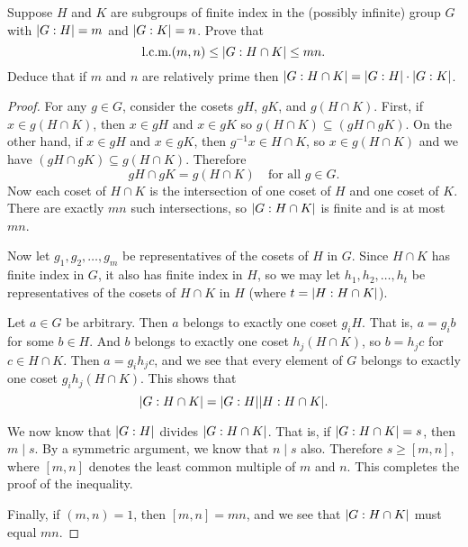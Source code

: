  Suppose $H$ and $K$ are subgroups of finite index in the
(possibly infinite) group $G$ with $\lvert{G:H}\rvert = m$ and
$\lvert{G:K}\rvert = n$. Prove that
\begin{equation*}
  \text{l.c.m.}(m,n)\leq\lvert{G:H\cap K}\rvert\leq mn.
\end{equation*}
Deduce that if $m$ and $n$ are relatively prime then
$\lvert{G:H\cap K}\rvert = \lvert{G:H}\rvert\cdot\lvert{G:K}\rvert$.
\begin{proof}
  For any $g\in G$, consider the cosets $gH$, $gK$, and $g(H\cap
  K)$. First, if $x\in g(H\cap K)$, then $x\in gH$ and $x\in gK$ so
  $g(H\cap K)\subseteq(gH\cap gK)$. On the other hand, if $x\in gH$
  and $x\in gK$, then $g^{-1}x\in H\cap K$, so $x\in g(H\cap K)$ and
  we have $(gH\cap gK)\subseteq g(H\cap K)$. Therefore
  \begin{equation*}
    gH\cap gK = g(H\cap K)
    \quad\text{for all $g\in G$}.
  \end{equation*}
  Now each coset of $H\cap K$ is the intersection of one coset of $H$
  and one coset of $K$. There are exactly $mn$ such intersections, so
  $\lvert{G:H\cap K}\rvert$ is finite and is at most $mn$.

  Now let $g_1,g_2,\dots,g_m$ be representatives of the cosets of $H$
  in $G$. Since $H\cap K$ has finite index in $G$, it also has finite
  index in $H$, so we may let $h_1,h_2,\dots,h_t$ be representatives
  of the cosets of $H\cap K$ in $H$ (where $t = \lvert{H:H\cap
    K}\rvert$).

  Let $a\in G$ be arbitrary. Then $a$ belongs to exactly one coset
  $g_iH$. That is, $a = g_ib$ for some $b\in H$. And $b$ belongs to
  exactly one coset $h_j(H\cap K)$, so $b = h_jc$ for $c\in H\cap
  K$. Then $a = g_ih_jc$, and we see that every element of $G$ belongs
  to exactly one coset $g_ih_j(H\cap K)$. This shows that
  \begin{equation*}
    \lvert{G:H\cap K}\rvert = \lvert{G:H}\rvert\lvert{H:H\cap K}\rvert.
  \end{equation*}

  We now know that $\lvert{G:H}\rvert$ divides $\lvert{G:H\cap
    K}\rvert$. That is, if $\lvert{G:H\cap K}\rvert = s$, then $m\mid s$. By a
  symmetric argument, we know that $n\mid s$ also. Therefore
  $s\geq[m,n]$, where $[m,n]$ denotes the least common multiple of $m$
  and $n$. This completes the proof of the inequality.

  Finally, if $(m,n) = 1$, then $[m,n] = mn$, and we see that
  $\lvert{G:H\cap K}\rvert$ must equal $mn$.
\end{proof}

